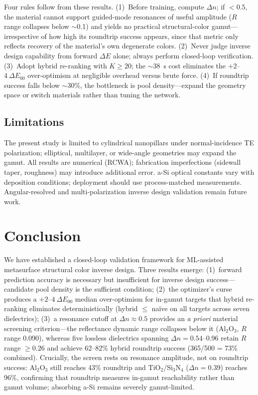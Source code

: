 \documentclass[10pt,twocolumn]{article}
\begin{document}
Four rules follow from these results. (1)~Before training, compute $\Delta n$; if $< 0.5$, the material cannot support guided-mode resonances of useful amplitude ($R$ range collapses below $\sim$0.1) and yields no practical structural-color gamut---irrespective of how high its roundtrip success appears, since that metric only reflects recovery of the material's own degenerate colors. (2)~Never judge inverse design capability from forward $\Delta E$ alone; always perform closed-loop verification. (3)~Adopt hybrid re-ranking with $K \ge 20$; the $\sim$38~s cost eliminates the $+2$--$4\ \Delta E_{00}$ over-optimism at negligible overhead versus brute force. (4)~If roundtrip success falls below $\sim$30\%, the bottleneck is pool density---expand the geometry space or switch materials rather than tuning the network.

\subsection{Limitations}

The present study is limited to cylindrical nanopillars under normal-incidence TE polarization; elliptical, multilayer, or wide-angle geometries may expand the gamut. All results are numerical (RCWA); fabrication imperfections (sidewall taper, roughness) may introduce additional error. a-Si optical constants vary with deposition conditions; deployment should use process-matched measurements. Angular-resolved and multi-polarization inverse design validation remain future work.

\section{Conclusion}

We have established a closed-loop validation framework for ML-assisted metasurface structural color inverse design. Three results emerge: (1)~forward prediction accuracy is necessary but insufficient for inverse design success---candidate pool density is the sufficient condition; (2)~the optimizer's curse produces a $+2$--$4\ \Delta E_{00}$ median over-optimism for in-gamut targets that hybrid re-ranking eliminates deterministically (hybrid $\le$ na\"ive on all targets across seven dielectrics); (3)~a resonance cutoff at $\Delta n \approx 0.5$ provides an \textit{a priori} material screening criterion---the reflectance dynamic range collapses below it (Al$_2$O$_3$, $R$ range 0.090), whereas five lossless dielectrics spanning $\Delta n = 0.54$--0.96 retain $R$ range $\ge 0.26$ and achieve 62--82\% hybrid roundtrip success (365/500 = 73\% combined). Crucially, the screen rests on resonance amplitude, not on roundtrip success: Al$_2$O$_3$ still reaches 43\% roundtrip and TiO$_2$/Si$_3$N$_4$ ($\Delta n = 0.39$) reaches 96\%, confirming that roundtrip measures in-gamut reachability rather than gamut volume; absorbing a-Si remains severely gamut-limited.
\end{document}
